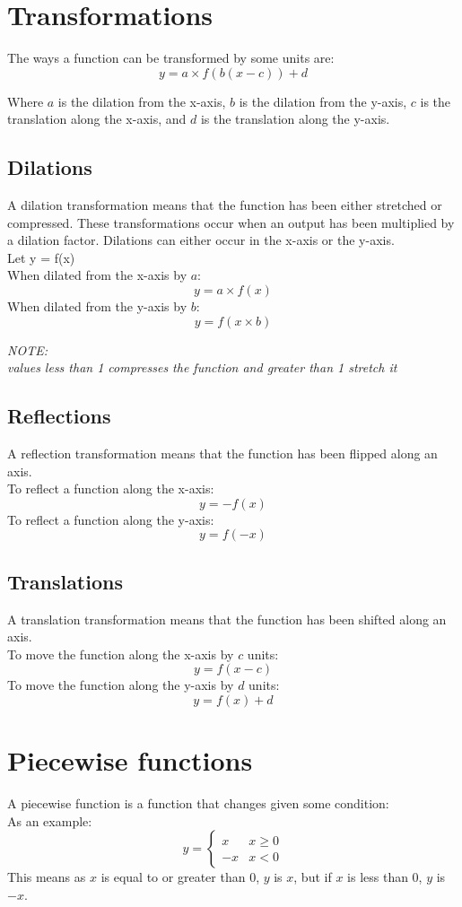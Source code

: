 \documentclass{book}
\newenvironment{note}{\begin{center}\em NOTE:\\}{\end{center}}
\begin{document}
\chapter{Transformations}
The ways a function can be transformed by some units are:
\[
	y = a \times f(b(x - c)) + d
\]

Where $a$ is the dilation from the x-axis, $b$ is the dilation from the y-axis, $c$ is the translation along the x-axis, and $d$ is the translation along the y-axis.

\section{Dilations}
A dilation transformation means that the function has been either stretched or compressed.  These transformations occur when an output has been multiplied by a dilation factor.  Dilations can either occur in the x-axis or the y-axis.\\
Let y = f(x)\\
When dilated from the x-axis by $a$:
\[
	y = a \times f(x)
\]
When dilated from the y-axis by $b$:
\[
	y = f(x \times b)
\]
\begin{note}
	values less than 1 compresses the function and greater than 1 stretch it
\end{note}

\section{Reflections}
A reflection transformation means that the function has been flipped along an axis.\\
To reflect a function along the x-axis:
\[
	y = -f(x)
\]
To reflect a function along the y-axis:
\[
	y = f(-x)
\]

\section{Translations}
A translation transformation means that the function has been shifted along an axis.\\
To move the function along the x-axis by $c$ units:
\[
	y = f(x - c)
\]
To move the function along the y-axis by $d$ units:
\[
	y = f(x) + d
\]

\chapter{Piecewise functions}
A piecewise function is a function that changes given some condition:\\
As an example:
\[
	y = \begin{cases}
		x  & x \geq 0 \\
		-x & x < 0
	\end{cases}
\]
This means as $x$ is equal to or greater than 0, $y$ is $x$, but if $x$ is less than 0, $y$ is $-x$.
\end{document}
